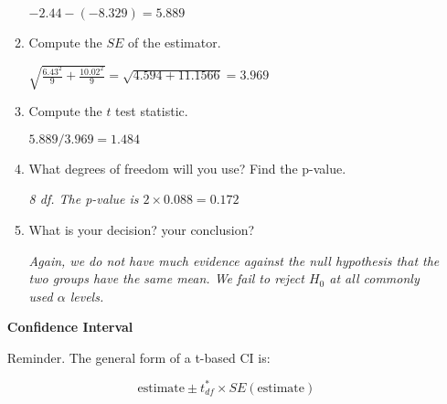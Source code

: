 \begin{enumerate}
\begin{enumerate}
\begin{key}
  {\it  $ -2.44 -( -8.329) = 5.889$}
\end{key}

      \item Compute the $SE$ of the estimator.
\begin{students}
    \vspace{1cm}    
\end{students}

\begin{key}
  {\it  $ \sqrt{ \frac{6.43^2}{9} + \frac{10.02^2}{9}} = \sqrt{
    4.594 + 11.1566 } = 3.969$ }
\end{key}

      \item Compute the $t$ test statistic.
\begin{students}
    \vspace{1cm}    
\end{students}

\begin{key}
  {\it   $ 5.889 / 3.969 = 1.484$}
\end{key}

      \item What degrees of freedom will you use?  Find the p-value.
\begin{students}
    \vspace{1cm}    
\end{students}

\begin{key}
  {\it  8 df.  The p-value is $2 \times 0.088 = 0.172 $}
\end{key}

      \item What is your decision? your conclusion? 
\begin{students}
    \vspace{2cm}    
\end{students}

\begin{key}
  {\it  Again, we do not have much evidence against the null
    hypothesis that the two groups have the same mean. We fail to
    reject $H_0$ at all commonly used $\alpha$ levels. }
\end{key}

     \end{enumerate}

     \begin{center}
       {\large\bf Confidence Interval}

 Reminder. The general form of a t-based CI is:
     \end{center}
  $$ \mbox{estimate} \pm t^*_{df} \times SE(\mbox{estimate}) $$ 


\end{enumerate}
